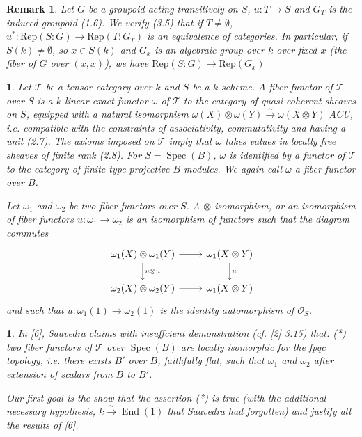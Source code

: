 \documentclass{article}
\newtheorem{env}[term]{}
\newtheorem{remark}[term]{Remark}
\DeclareMathOperator{\spec}{\text{Spec}}
\DeclareMathOperator{\End}{\text{End}}
\begin{document}
\begin{remark}
  Let $G$ be a groupoid acting transitively on $S$, $u: T \rightarrow S$ and $G_T$ is the induced groupoid (1.6). 
  We verify (3.5) that if $T \neq \emptyset$, $u^* : \text{Rep}(S:G) \rightarrow \text{Rep}(T:G_T)$ is an 
  equivalence of categories. In particular, if $S(k) \neq \emptyset$, so $x \in S(k)$ and $G_x$ is an algebraic 
  group over $k$ over fixed $x$ (the fiber of $G$ over $(x,x)$), we have $\text{Rep}(S:G) \rightarrow \text{Rep}(G_x)$
\end{remark}
\begin{env}
  Let $\mathcal T$ be a tensor category over $k$ and $S$ be a $k$-scheme. A fiber functor of $\mathcal T$ over $S$ 
  is a $k$-linear exact functor $\omega$ of $\mathcal T$ to the category of quasi-coherent sheaves on $S$,
  equipped with a natural isomorphism $\omega(X) \otimes \omega (Y) \xrightarrow \sim \omega(X \otimes Y)$ ACU, i.e. 
  compatible with the constraints of associativity, commutativity and having a unit (2.7). The axioms imposed on 
  $\mathcal T$ imply that $\omega$ takes values in locally free sheaves of finite rank (2.8). For $S = \spec (B)$,
  $\omega$ is identified by a functor of $\mathcal T$ to the category of finite-type projective $B$-modules. We 
  again call $\omega$ a fiber functor over $B$. 

  Let $\omega_1$ and $\omega_2$ be two fiber functors over $S$. A $\otimes$-isomorphism, or an isomorphism of 
  fiber functors $u:\omega_1 \rightarrow \omega_2$ is an isomorphism of functors such that the diagram 
  commutes 
  $$\begin{tikzcd}
    \omega_1(X) \otimes \omega_1(Y) \arrow[r]\arrow[d,"u\otimes u"]& \omega_1(X \otimes Y) \arrow[d,"u"]\\
    \omega_2(X) \otimes \omega_2(Y) \arrow[r] & \omega_1(X \otimes Y)
  \end{tikzcd}$$
  and such that $u: \omega_1(1) \rightarrow \omega_2(1)$ is the identity automorphism of $\mathcal O_S$.
\end{env}

\begin{env}
  In [6], Saavedra claims with insuffcient demonstration (cf. [2] 3.15) that: (*) two fiber functors of $\mathcal T$ 
  over $\spec (B)$ are locally isomorphic for the fpqc topology, i.e. there exists $B'$ over $B$, faithfully flat,
  such that $\omega_1$ and $\omega_2$ after extension of scalars from $B$ to $B'$.

  Our first goal is the show that the assertion (*) is true (with the additional necessary hypothesis, 
  $k \xrightarrow \sim \End (1)$ that Saavedra had forgotten) and justify all the results of [6].
\end{env}
\end{document}
